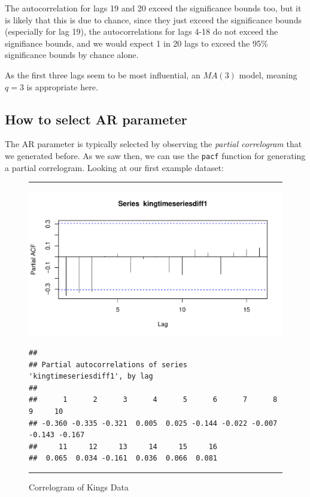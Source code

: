 \documentclass[11pt, letterpaper, twoside]{memoir}\usepackage{knitr}
\begin{document}
The autocorrelation for lags 19 and 20 exceed the significance bounds too, but it is likely that this is due to chance, since they just exceed the significance bounds (especially for lag 19), the autocorrelations for lags 4-18 do not exceed the signifiance bounds, and we would expect 1 in 20 lags to exceed the 95\% significance bounds by chance alone.

As the first three lags seem to be most influential, an $MA(3)$ model, meaning $q = 3$ is appropriate here.

\subsection{How to select AR parameter}

The AR parameter is typically selected by observing the \emph{partial correlogram} that we generated before. As we saw then, we can use the \texttt{pacf} function for generating a partial correlogram. Looking at our first example dataset:

\begin{figure}
\centering
\rule{4in}{1pt}
\begin{knitrout}
\color{fgcolor}\begin{kframe}
\begin{alltt}
 
\end{alltt}
\end{kframe}
\includegraphics[width=\maxwidth]{figure/unnamed-chunk-124-1} 
\begin{kframe}\begin{alltt}
 \hlstd{=}\hlstd{)} 
\end{alltt}
\begin{verbatim}
## 
## Partial autocorrelations of series 'kingtimeseriesdiff1', by lag
## 
##      1      2      3      4      5      6      7      8      9     10 
## -0.360 -0.335 -0.321  0.005  0.025 -0.144 -0.022 -0.007 -0.143 -0.167 
##     11     12     13     14     15     16 
##  0.065  0.034 -0.161  0.036  0.066  0.081
\end{verbatim}
\end{kframe}
\end{knitrout}
\caption{Correlogram of Kings Data}
\label{Fig:corkings}
\rule{4in}{1pt}
\end{figure}
\end{document}
